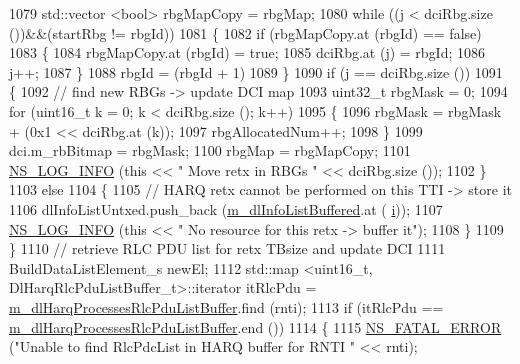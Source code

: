 \begin{DoxyCode}
1079               std::vector <bool> rbgMapCopy = rbgMap;
1080               \textcolor{keywordflow}{while} ((j < dciRbg.size ())&&(startRbg != rbgId))
1081                 \{
1082                   \textcolor{keywordflow}{if} (rbgMapCopy.at (rbgId) == \textcolor{keyword}{false})
1083                     \{
1084                       rbgMapCopy.at (rbgId) = \textcolor{keyword}{true};
1085                       dciRbg.at (j) = rbgId;
1086                       j++;
1087                     \}
1088                   rbgId = (rbgId + 1) %
1089                 \}
1090               \textcolor{keywordflow}{if} (j == dciRbg.size ())
1091                 \{
1092                   \textcolor{comment}{// find new RBGs -> update DCI map}
1093                   uint32\_t rbgMask = 0;
1094                   \textcolor{keywordflow}{for} (uint16\_t k = 0; k < dciRbg.size (); k++)
1095                     \{
1096                       rbgMask = rbgMask + (0x1 << dciRbg.at (k));
1097                       rbgAllocatedNum++;
1098                     \}
1099                   dci.m\_rbBitmap = rbgMask;
1100                   rbgMap = rbgMapCopy;
1101                   \hyperlink{group__logging_gafbd73ee2cf9f26b319f49086d8e860fb}{NS\_LOG\_INFO} (\textcolor{keyword}{this} << \textcolor{stringliteral}{" Move retx in RBGs "} << dciRbg.size ());
1102                 \}
1103               \textcolor{keywordflow}{else}
1104                 \{
1105                   \textcolor{comment}{// HARQ retx cannot be performed on this TTI -> store it}
1106                   dlInfoListUntxed.push\_back (\hyperlink{classns3_1_1CqaFfMacScheduler_aabc929a8c1c30338a5fa0826bb7cd2b8}{m\_dlInfoListBuffered}.at (
      \hyperlink{bernuolliDistribution_8m_a6f6ccfcf58b31cb6412107d9d5281426}{i}));
1107                   \hyperlink{group__logging_gafbd73ee2cf9f26b319f49086d8e860fb}{NS\_LOG\_INFO} (\textcolor{keyword}{this} << \textcolor{stringliteral}{" No resource for this retx -> buffer it"});
1108                 \}
1109             \}
1110           \textcolor{comment}{// retrieve RLC PDU list for retx TBsize and update DCI}
1111           BuildDataListElement\_s newEl;
1112           std::map <uint16\_t, DlHarqRlcPduListBuffer\_t>::iterator itRlcPdu =  
      \hyperlink{classns3_1_1CqaFfMacScheduler_a019cbb20e91d699a8c7e26fb8d69ff4e}{m\_dlHarqProcessesRlcPduListBuffer}.find (rnti);
1113           \textcolor{keywordflow}{if} (itRlcPdu == \hyperlink{classns3_1_1CqaFfMacScheduler_a019cbb20e91d699a8c7e26fb8d69ff4e}{m\_dlHarqProcessesRlcPduListBuffer}.end ())
1114             \{
1115               \hyperlink{group__fatal_ga5131d5e3f75d7d4cbfd706ac456fdc85}{NS\_FATAL\_ERROR} (\textcolor{stringliteral}{"Unable to find RlcPdcList in HARQ buffer for RNTI "} << rnti);

\end{DoxyCode}
